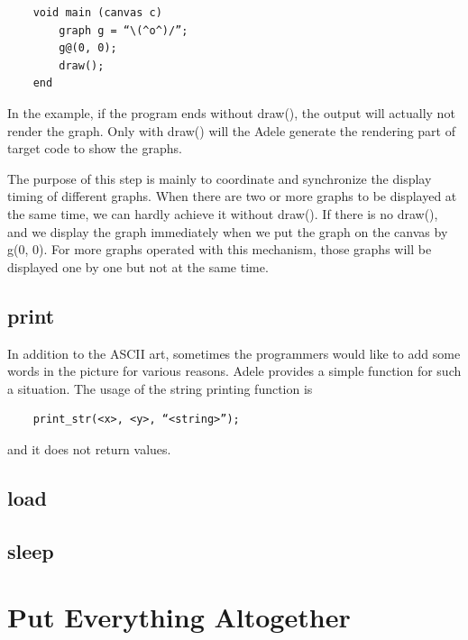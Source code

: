 \documentclass[11pt,letterpaper]{article}
\begin{document}
\begin{lstlisting}
	void main (canvas c)
		graph g = “\(^o^)/”;
		g@(0, 0);
		draw();
	end
\end{lstlisting}

In the example, if the program ends without draw(), the output will actually not render the graph. Only with draw() will the Adele generate the rendering part of target code to show the graphs.

The purpose of this step is mainly to coordinate and synchronize the display timing of different graphs. When there are two or more graphs to be displayed at the same time, we can hardly achieve it without draw(). If there is no draw(), and we display the graph immediately when we put the graph on the canvas by g\@(0, 0). For more graphs operated with this mechanism, those graphs will be displayed one by one but not at the same time.

\subsection {print}
In addition to the ASCII art, sometimes the programmers would like to add some words in the picture for various reasons. Adele provides a simple function for such a situation. The usage of the string printing function is
\begin{lstlisting}
	print_str(<x>, <y>, “<string>”);
\end{lstlisting}
and it does not return values.

\subsection {load}

\subsection {sleep}


\section {Put Everything Altogether}
\end{document}
